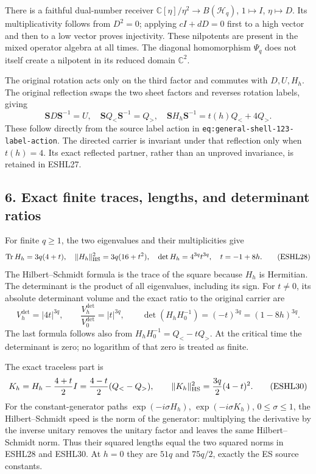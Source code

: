 \documentclass[
  10pt,
  a4paper,
]{article}
\begin{document}
There is a faithful dual-number receiver
\(\mathbb C[\eta]/\eta^2\to B(\mathcal H_q)\), \(1\mapsto I\),
\(\eta\mapsto D\). Its multiplicativity follows from \(D^2=0\); applying
\(cI+dD=0\) first to a high vector and then to a low vector proves
injectivity. These nilpotents are present in the mixed operator algebra
at all times. The diagonal homomorphism \(\Psi_q\) does not itself
create a nilpotent in its reduced domain \(\mathbb C^2\).

The original rotation acts only on the third factor and commutes with
\(D,U,H_h\). The original reflection swaps the two sheet factors and
reverses rotation labels, giving \[
\mathbf S D\mathbf S^{-1}=U,
\quad\mathbf S Q_<\mathbf S^{-1}=Q_>,
\quad\mathbf S H_h\mathbf S^{-1}=t(h)Q_<+4Q_>.
\tag{ESHL27}
\] These follow directly from the source label action in
\texttt{eq:\allowbreak{}general-\allowbreak{}shell-\allowbreak{}123-\allowbreak{}label-\allowbreak{}action}. The directed carrier is
invariant under that reflection only when \(t(h)=4\). Its exact
reflected partner, rather than an unproved invariance, is retained in
ESHL27.

\subsection{6. Exact finite traces, lengths, and determinant
ratios}\label{exact-finite-traces-lengths-and-determinant-ratios}

For finite \(q\ge1\), the two eigenvalues and their multiplicities give
\[
\operatorname{Tr}H_h=3q(4+t),\quad
\|H_h\|_{\rm HS}^2=3q(16+t^2),\quad
\det H_h=4^{3q}t^{3q},
\quad t=-1+8h.
\tag{ESHL28}
\] The Hilbert--Schmidt formula is the trace of the square because
\(H_h\) is Hermitian. The determinant is the product of all eigenvalues,
including its sign. For \(t\ne0\), its absolute determinant volume and
the exact ratio to the original carrier are \[
V_h^{\det}=|4t|^{3q},\qquad
\frac{V_h^{\det}}{V_0^{\det}}=|t|^{3q},
\qquad \det(H_hH_0^{-1})=(-t)^{3q}=(1-8h)^{3q}.
\tag{ESHL29}
\] The last formula follows also from \(H_hH_0^{-1}=Q_<-tQ_>\). At the
critical time the determinant is zero; no logarithm of that zero is
treated as finite.

The exact traceless part is \[
K_h=H_h-\frac{4+t}{2}I
=\frac{4-t}{2}(Q_<-Q_>),
\qquad \|K_h\|_{\rm HS}^2=\frac{3q}{2}(4-t)^2.
\tag{ESHL30}
\] For the constant-generator paths \(\exp(-i\sigma H_h)\),
\(\exp(-i\sigma K_h)\), \(0\le\sigma\le1\), the Hilbert--Schmidt speed
is the norm of the generator: multiplying the derivative by the inverse
unitary removes the unitary factor and leaves the same Hilbert--Schmidt
norm. Thus their squared lengths equal the two squared norms in ESHL28
and ESHL30. At \(h=0\) they are \(51q\) and \(75q/2\), exactly the ES
source constants.
\end{document}
